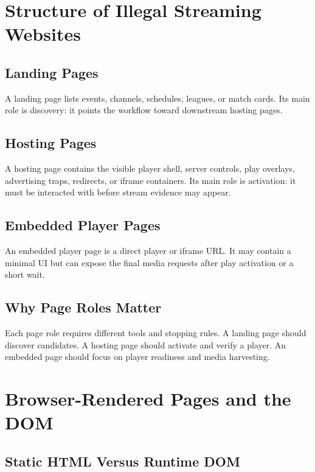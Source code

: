 \section{Structure of Illegal Streaming Websites}

\subsection{Landing Pages}

A landing page lists events, channels, schedules, leagues, or match cards. Its
main role is discovery: it points the workflow toward downstream hosting pages.

\subsection{Hosting Pages}

A hosting page contains the visible player shell, server controls, play
overlays, advertising traps, redirects, or iframe containers. Its main role is
activation: it must be interacted with before stream evidence may appear.

\subsection{Embedded Player Pages}

An embedded player page is a direct player or iframe URL. It may contain a
minimal UI but can expose the final media requests after play activation or a
short wait.

\subsection{Why Page Roles Matter}

Each page role requires different tools and stopping rules. A landing page
should discover candidates. A hosting page should activate and verify a player.
An embedded page should focus on player readiness and media harvesting.



\section{Browser-Rendered Pages and the DOM}

\subsection{Static HTML Versus Runtime DOM}

